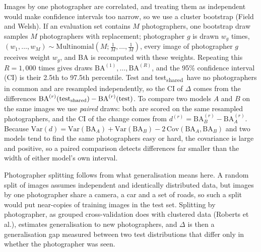 \documentclass[11pt]{article}
\newcommand{\tsh}{test\textsubscript{shared}}
\begin{document}
Images by one photographer are correlated, and treating them as independent would make confidence intervals too narrow, so we use a cluster bootstrap (Field and Welsh). If an evaluation set contains $M$
photographers, one bootstrap draw samples $M$ photographers with replacement; photographer $g$ is drawn $w_g$
times, $(w_1,\dots,w_M)\sim\mathrm{Multinomial}(M;\tfrac1M,\dots,\tfrac1M)$, every image of photographer $g$
receives weight $w_g$, and BA is recomputed with these weights. Repeating this $R=1{,}000$ times gives draws
$\mathrm{BA}^{(1)},\dots,\mathrm{BA}^{(R)}$, and the 95\% confidence interval (CI) is their 2.5th to 97.5th
percentile. Test and \tsh\ have no photographers in common and are resampled independently, so the CI of
$\Delta$ comes from the differences $\mathrm{BA}^{(r)}(\text{\tsh})-\mathrm{BA}^{(r)}(\text{test})$. To
compare two models $A$ and $B$ on the same images we use \emph{paired} draws: both are scored on the same
resampled photographers, and the CI of the change comes from $d^{(r)}=\mathrm{BA}^{(r)}_B-\mathrm{BA}^{(r)}_A$.
Because $\mathrm{Var}(d)=\mathrm{Var}(\mathrm{BA}_A)+\mathrm{Var}(\mathrm{BA}_B)-2\,\mathrm{Cov}(\mathrm{BA}_A,\mathrm{BA}_B)$
and two models tend to find the same photographers easy or hard, the covariance is large and positive, so a
paired comparison detects differences far smaller than the width of either model's own interval.

Photographer splitting follows from what generalisation means here. A random split of images assumes
independent and identically distributed data, but images by one photographer share a camera, a car and a set
of roads, so such a split would put near-copies of training images in the test set. Splitting by
photographer, as grouped cross-validation does with clustered data (Roberts et al.), estimates
generalisation to new photographers, and $\Delta$ is then a generalisation gap measured between two test
distributions that differ only in whether the photographer was seen.
\end{document}
